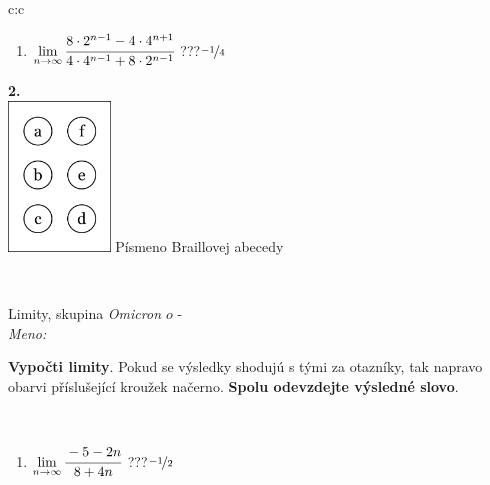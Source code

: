 \documentclass[10pt]{report}
\newcommand\omicron{o}
\begin{document}
\begin{tabular}{c:c}
\begin{minipage}[c][104.5mm][t]{0.5\linewidth}
\begin{center}
\begin{minipage}{0.79\linewidth}
\begin{center}
\begin{varwidth}{\linewidth}
\begin{enumerate}
\item $\lim\limits_{n\to\infty}\cfrac{8\cdot 2^{n-1}-4\cdot 4^{n+1}}{4\cdot 4^{n-1}+8\cdot 2^{n-1}}$\quad \dotfill\; ???\;\dotfill \quad $\nicefrac{-1}{4}$
\end{enumerate}
\end{varwidth}
\end{center}
\end{minipage}
\begin{minipage}{0.20\linewidth}
\begin{center}
{\Huge\bfseries 2.} \\[2mm]
\includegraphics[height=40mm]{../images/braille.png}
{\small Písmeno Braillovej abecedy}
\end{center}
\end{minipage}
\end{center}
\end{minipage}
\\ \hdashline
\begin{minipage}[c][104.5mm][t]{0.5\linewidth}
\begin{center}
\vspace{7mm}
{\huge Limity, skupina \textit{Omicron $\omicron$} -}\\[5mm]
\textit{Meno:}\phantom{xxxxxxxxxxxxxxxxxxxxxxxxxxxxxxxxxxxxxxxxxxxxxxxxxxxxxxxxxxxxxxxxx}\\[5mm]
\begin{minipage}{0.95\linewidth}
\begin{center}
\textbf{Vypočti limity}. Pokud se výsledky shodujú s tými za otazníky, tak napravo\\obarvi příslušející kroužek načerno. \textbf{Spolu odevzdejte výsledné slovo}.
\end{center}
\end{minipage}
\\[1mm]
\begin{minipage}{0.79\linewidth}
\begin{center}
\begin{varwidth}{\linewidth}
\begin{enumerate}
\normalsize
\item $\lim\limits_{n\to\infty}\cfrac{-5-2n}{8+4n}$\quad \dotfill\; ???\;\dotfill \quad $\nicefrac{-1}{2}$

\end{enumerate}
\end{varwidth}
\end{center}
\end{minipage}
\end{center}
\end{minipage}
\end{tabular}
\end{document}
